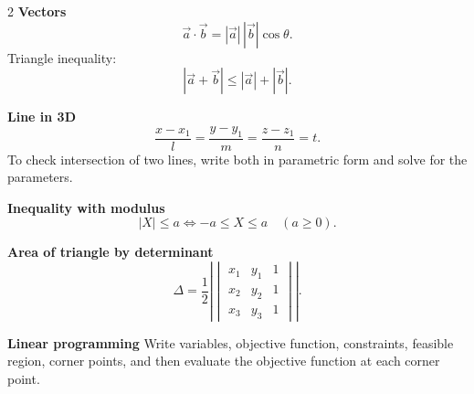 \documentclass[11pt,a4paper]{article}
\begin{document}
\begin{tcolorbox}[breakable,colback=blue!3,colframe=blue!40,title=\textbf{Important theory, formulas and methods}]
\begin{multicols}{2}
\textbf{Vectors}
\[
\vec a\cdot\vec b=|\vec a|\,|\vec b|\cos\theta.
\]
Triangle inequality:
\[
|\vec a+\vec b|\le |\vec a|+|\vec b|.
\]

\textbf{Line in 3D}
\[
\frac{x-x_1}{l}=\frac{y-y_1}{m}=\frac{z-z_1}{n}=t.
\]
To check intersection of two lines, write both in parametric form and solve for the parameters.

\textbf{Inequality with modulus}
\[
|X|\le a\iff -a\le X\le a\quad(a\ge0).
\]

\textbf{Area of triangle by determinant}
\[
\Delta=\frac12\left|
\begin{vmatrix}
x_1&y_1&1\\
x_2&y_2&1\\
x_3&y_3&1
\end{vmatrix}\right|.
\]

\textbf{Linear programming}
Write variables, objective function, constraints, feasible region, corner points, and then evaluate the objective function at each corner point.
\end{multicols}
\end{tcolorbox}
\end{document}

